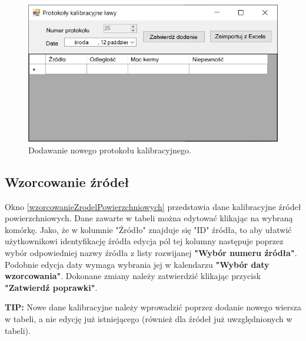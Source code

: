 \begin{figure}[htb]
	\centering
	\includegraphics{obrazki/Ustawienia/protokoly_kalibracyjne_lawy_dodawanie.png}
	\caption{Dodawanie nowego protokołu kalibracyjnego.}
	\label{protokolyKalLawyDodaj}
\end{figure}

\subsection{Wzorcowanie źródeł}
\label{wzor_zrodel}

Okno \ref{wzorcowanieZrodelPowierzchniowych} przedstawia dane kalibracyjne źródeł powierzchniowych. Dane zawarte w tabeli można edytować klikając na wybraną komórkę. Jako, że w kolumnie "Źródło" znajduje się "ID" źródła, to aby ułatwić użytkownikowi identyfikację źródła edycja pól tej kolumny następuje poprzez wybór odpowiedniej nazwy źródła z listy rozwijanej \textbf{"Wybór numeru źródła"}. Podobnie edycja daty wymaga wybrania jej w kalendarzu \textbf{"Wybór daty wzorcowania"}. Dokonane zmiany należy zatwierdzić klikając przycisk \textbf{"Zatwierdź poprawki"}. 

\textbf{TIP:} Nowe dane kalibracyjne należy wprowadzić poprzez dodanie nowego wiersza w tabeli, a nie edycję już istniejącego (również dla źródeł już uwzględnionych w tabeli).

